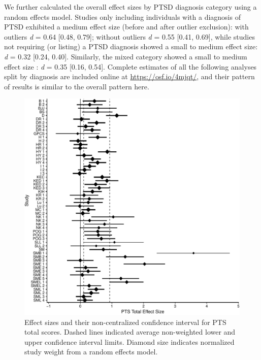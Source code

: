 \documentclass[man, mask]{apa6}
\theoremstyle{definition}
\theoremstyle{definition}
\theoremstyle{definition}
\theoremstyle{remark}
\begin{document}
We further calculated the overall effect sizes by PTSD diagnosis
category using a random effects model. Studies only including
individuals with a diagnosis of PTSD exhibited a medium effect size
(before and after outlier exclusion): with outliers \emph{d} = 0.64
{[}0.48, 0.79{]}; without outliers \emph{d} = 0.55 {[}0.41, 0.69{]},
while studies not requiring (or listing) a PTSD diagnosis showed a small
to medium effect size: \emph{d} = 0.32 {[}0.24, 0.40{]}. Similarly, the
mixed category showed a small to medium effect size : \emph{d} = 0.35
{[}0.16, 0.54{]}. Complete estimates of all the following analyses split
by diagnosis are included online at \url{https://osf.io/4mjqt/}, and
their pattern of results is similar to the overall pattern here.

\begin{figure}[htbp]
\centering
\includegraphics{meta_markdown_files/figure-latex/ptspicoverall-1.pdf}
\caption{\label{fig:ptspicoverall}Effect sizes and their non-centralized
confidence interval for PTS total scores. Dashed lines indicated average
non-weighted lower and upper confidence interval limits. Diamond size
indicates normalized study weight from a random effects model.}
\end{figure}
\end{document}

